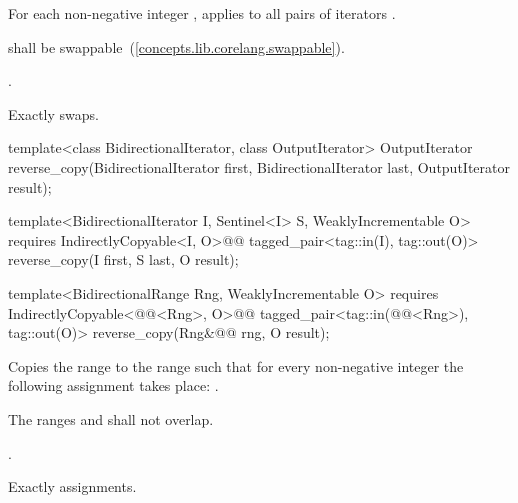 \begin{itemdescr}
\pnum
\effects
For each non-negative integer
,
applies
to all pairs of iterators
.

\begin{removedblock}
\pnum
\requires
{} shall be swappable~(\ref{concepts.lib.corelang.swappable}).
\end{removedblock}

\begin{addedblock}
\pnum
\returns {}.
\end{addedblock}

\pnum
\complexity
Exactly
swaps.
\end{itemdescr}

%
\begin{removedblock}
\begin{itemdecl}
template<class BidirectionalIterator, class OutputIterator>
  OutputIterator
    reverse_copy(BidirectionalIterator first,
                 BidirectionalIterator last, OutputIterator result);
\end{itemdecl}
\end{removedblock}
\begin{addedblock}
\begin{itemdecl}
template<BidirectionalIterator I, Sentinel<I> S, WeaklyIncrementable O>
  requires IndirectlyCopyable<I, O>@\newtxt{()}@
  tagged_pair<tag::in(I), tag::out(O)> reverse_copy(I first, S last, O result);

template<BidirectionalRange Rng, WeaklyIncrementable O>
  requires IndirectlyCopyable<@@<Rng>, O>@\newtxt{()}@
  tagged_pair<tag::in(@@<Rng>), tag::out(O)>
    reverse_copy(Rng&@\newtxt{\&}@ rng, O result);
\end{itemdecl}
\end{addedblock}

\begin{itemdescr}
\pnum
\effects
Copies the range
to the range
such that
for every non-negative integer
the following assignment takes place:
.

\pnum
\requires
The ranges
and
shall not overlap.

\pnum
\returns
{}.

\pnum
\complexity
Exactly
assignments.
\end{itemdescr}

